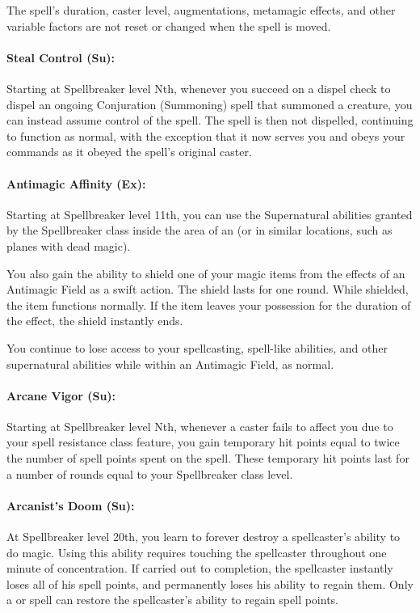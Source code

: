 The spell's duration, caster level, augmentations, metamagic effects, and other variable factors are not reset or changed when the spell is moved.
\paragraph{Steal Control (Su):} Starting at Spellbreaker level Nth, whenever you succeed on a dispel check to dispel an ongoing Conjuration (Summoning) spell that summoned a creature, you can instead assume control of the spell. The spell is then not dispelled, continuing to function as normal, with the exception that it now serves you and obeys your commands as it obeyed the spell's original caster.

\paragraph{Antimagic Affinity (Ex):} Starting at Spellbreaker level 11th, you can use the Supernatural abilities granted by the Spellbreaker class inside the area of an  (or in similar locations, such as planes with dead magic). 

You also gain the ability to shield one of your magic items from the effects of an Antimagic Field as a swift action. The shield lasts for one round. While shielded, the item functions normally. If the item leaves your possession for the duration of the effect, the shield instantly ends.

You continue to lose access to your spellcasting, spell-like abilities, and other supernatural abilities while within an Antimagic Field, as normal.
\paragraph{Arcane Vigor (Su):} Starting at Spellbreaker level Nth, whenever a caster fails to affect you due to your spell resistance class feature, you gain temporary hit points equal to twice the number of spell points spent on the spell. These temporary hit points last for a number of rounds equal to your Spellbreaker class level.

\paragraph{Arcanist's Doom (Su):} At Spellbreaker level 20th, you learn to forever destroy a spellcaster's ability to do magic.
Using this ability requires touching the spellcaster throughout one minute of concentration. If carried out to completion, the spellcaster instantly loses all of his spell points, and permanently loses his ability to regain them. Only a  or  spell can restore the spellcaster's ability to regain spell points.

